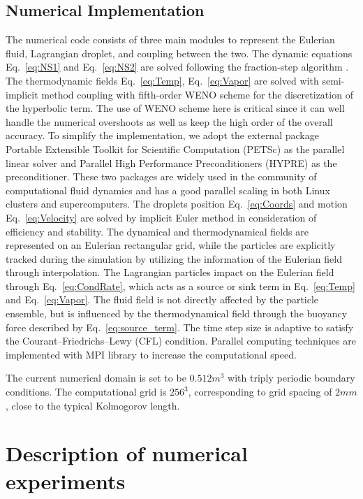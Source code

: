 \documentclass[draft,linenumbers]{agujournal}
\newcommand{\Eq}[1]{Eq.~\eqref{#1}} \newcommand{\Fig}[1]{Figure~\ref{#1}}
\begin{document}
\subsection{Numerical Implementation}
The numerical code consists of three main modules to represent the Eulerian fluid, Lagrangian droplet, and coupling between the two. The dynamic equations \Eq{eq:NS1} and \Eq{eq:NS2} are solved following the fraction-step algorithm \citep{Brown2001}. The thermodynamic fields \Eq{eq:Temp}, \Eq{eq:Vapor} are solved with semi-implicit method coupling with fifth-order WENO scheme for the discretization of the hyperbolic term. The use of WENO scheme here is critical since it can well handle the numerical overshoots as well as keep the high order of the overall accuracy. To simplify the implementation, we adopt the external package Portable Extensible Toolkit for Scientific Computation (PETSc) \citep{petsc_cite} as the parallel linear solver and Parallel High Performance Preconditioners (HYPRE) \citep{hypre_cite} as the preconditioner. These two packages are widely used in the community of computational fluid dynamics and has a good parallel scaling in both Linux clusters and supercomputers. The droplets position \Eq{eq:Coords} and motion \Eq{eq:Velocity} are solved by implicit Euler method in consideration of efficiency and stability. The dynamical and thermodynamical fields are represented on an Eulerian rectangular grid, while the particles are explicitly tracked during the simulation by utilizing the information of the Eulerian field through  interpolation. The Lagrangian particles impact on the Eulerian field through \Eq{eq:CondRate}, which acts as a source or sink term in \Eq{eq:Temp} and \Eq{eq:Vapor}. The fluid field is not directly affected by the particle ensemble, but is influenced by the thermodynamical field through the buoyancy force described by \Eq{eq:source_term}. The time step size is adaptive to satisfy the Courant--Friedrichs--Lewy (CFL) condition. Parallel computing techniques are implemented with MPI library to increase the computational speed.

The current numerical domain is set to be $0.512m^{3}$ with triply periodic boundary conditions. The computational grid is $256^{3}$, corresponding to grid spacing of $2mm$, close to the typical Kolmogorov length.

\section{Description of numerical experiments}\label{experiment_description}
\end{document}
